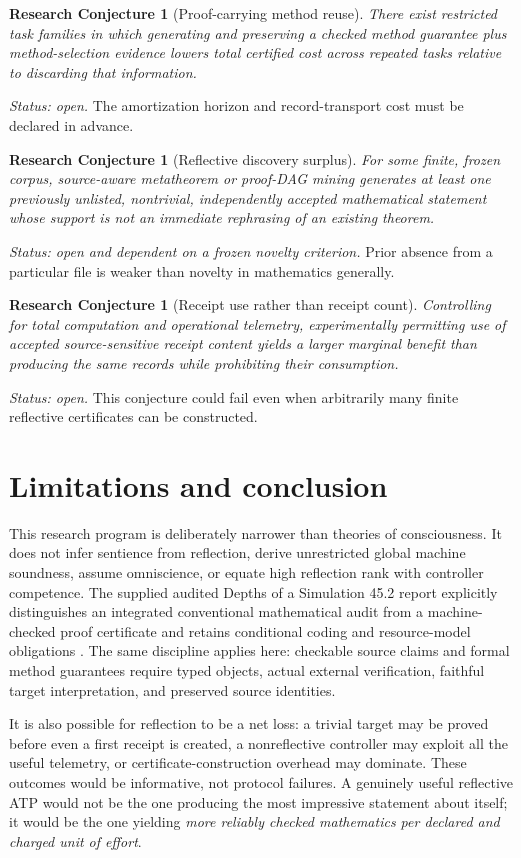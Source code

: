 \documentclass[11pt,letterpaper]{article}
\newtheorem{conjecture}[definition]{Research Conjecture}
\begin{document}
\begin{conjecture}[Proof-carrying method reuse]
There exist restricted task families in which generating and preserving a checked method guarantee plus method-selection evidence lowers total certified cost across repeated tasks relative to discarding that information.
\end{conjecture}
\emph{Status: open.} The amortization horizon and record-transport cost must be declared in advance.

\begin{conjecture}[Reflective discovery surplus]
For some finite, frozen corpus, source-aware metatheorem or proof-DAG mining generates at least one previously unlisted, nontrivial, independently accepted mathematical statement whose support is not an immediate rephrasing of an existing theorem.
\end{conjecture}
\emph{Status: open and dependent on a frozen novelty criterion.} Prior absence from a particular file is weaker than novelty in mathematics generally.

\begin{conjecture}[Receipt use rather than receipt count]
Controlling for total computation and operational telemetry, experimentally permitting use of accepted source-sensitive receipt content yields a larger marginal benefit than producing the same records while prohibiting their consumption.
\end{conjecture}
\emph{Status: open.} This conjecture could fail even when arbitrarily many finite reflective certificates can be constructed.

\section{Limitations and conclusion}
This research program is deliberately narrower than theories of consciousness. It does not infer sentience from reflection, derive unrestricted global machine soundness, assume omniscience, or equate high reflection rank with controller competence. The supplied audited Depths of a Simulation 45.2 report explicitly distinguishes an integrated conventional mathematical audit from a machine-checked proof certificate and retains conditional coding and resource-model obligations \cite{depthsaudit}. The same discipline applies here: checkable source claims and formal method guarantees require typed objects, actual external verification, faithful target interpretation, and preserved source identities.

It is also possible for reflection to be a net loss: a trivial target may be proved before even a first receipt is created, a nonreflective controller may exploit all the useful telemetry, or certificate-construction overhead may dominate. These outcomes would be informative, not protocol failures. A genuinely useful reflective ATP would not be the one producing the most impressive statement about itself; it would be the one yielding \emph{more reliably checked mathematics per declared and charged unit of effort}.
\end{document}
